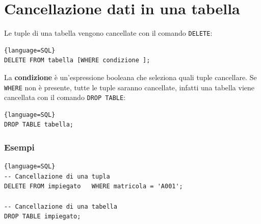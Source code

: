 \documentclass[11pt]{report}
\begin{document}
\section{Cancellazione dati in una tabella}

Le tuple di una tabella vengono cancellate con il comando \texttt{DELETE}:
\begin{lstlisting}{language=SQL}
DELETE FROM tabella [WHERE condizione ];
\end{lstlisting}

La \textbf{condizione} \`e un'espressione booleana che seleziona quali tuple cancellare. Se \texttt{WHERE} non \`e presente, tutte le tuple saranno cancellate, infatti una tabella viene cancellata con il comando \texttt{DROP TABLE}:
\begin{lstlisting}{language=SQL}
DROP TABLE tabella;
\end{lstlisting}

\subsubsection{Esempi}

\begin{lstlisting}{language=SQL}
-- Cancellazione di una tupla
DELETE FROM impiegato 	WHERE matricola = 'A001';

-- Cancellazione di una tabella
DROP TABLE impiegato;
\end{lstlisting}
\end{document}
